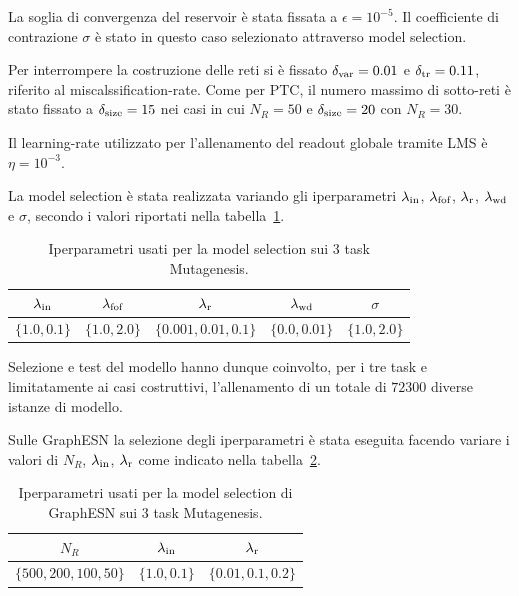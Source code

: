 La soglia di convergenza del reservoir è stata fissata a $\epsilon = 10^{-5}$. Il coefficiente di contrazione $\sigma$ è stato in questo caso selezionato attraverso model selection.

Per interrompere la costruzione delle reti si è fissato $\delta_\textup{var} = 0.01$ e $\delta_\textup{tr} = 0.11$, riferito al miscalssification-rate. Come per PTC, il numero massimo di sotto-reti è stato fissato a $\delta_\textup{size} = 15$ nei casi in cui $N_R = 50$ e $\delta_\textup{size} = 20$ con $N_R = 30$.

Il learning-rate utilizzato per l'allenamento del readout globale tramite LMS è $\eta = 10^{-3}$.

La model selection è stata realizzata variando gli iperparametri $\lambda_\textup{in}$, $\lambda_\textup{fof}$, $\lambda_\textup{r}$,  $\lambda_\textup{wd}$ e $\sigma$, secondo i valori riportati nella tabella~\ref{tab:esperimenti:grigliaMutag}.
\begin{table}[tbp]
\small
\caption[Model selection: iperparametri per Mutagenesis]{Iperparametri usati per la model selection sui 3 task Mutagenesis.}
\label{tab:esperimenti:grigliaMutag}
\centering
\begin{tabular}{*{5}{c}}
\toprule
$\lambda_\textup{in}$ & $\lambda_\textup{fof}$ & $\lambda_\textup{r}$ & $\lambda_\textup{wd}$ & $\sigma$ \\
\midrule
$\lbrace 1.0, 0.1 \rbrace$ & $\lbrace 1.0, 2.0 \rbrace$ & $\lbrace 0.001, 0.01, 0.1 \rbrace$ & $\lbrace 0.0, 0.01 \rbrace$ &  $\lbrace 1.0, 2.0 \rbrace$\\
\bottomrule
\end{tabular}
\end{table}
Selezione e test del modello hanno dunque coinvolto, per i tre task e limitatamente ai casi costruttivi, l'allenamento di un totale di $72300$ diverse istanze di modello.

Sulle GraphESN la selezione degli iperparametri è stata eseguita facendo variare i valori di $N_R$, $\lambda_\textup{in}$, $\lambda_\textup{r}$ come indicato nella tabella~\ref{tab:esperimenti:grigliaMutagStandard}.
\begin{table}[tbp]
\small
\caption[Model selection: iperparametri per GraphESN su Mutag]{Iperparametri usati per la model selection di GraphESN sui 3 task Mutagenesis.}
\label{tab:esperimenti:grigliaMutagStandard}
\centering
\begin{tabular}{*{3}{c}}
\toprule
$N_R$ & $\lambda_\textup{in}$ & $\lambda_\textup{r}$ \\
\midrule
$\lbrace 500, 200, 100, 50 \rbrace$ & $\lbrace 1.0, 0.1 \rbrace$ & $\lbrace 0.01, 0.1, 0.2 \rbrace$ \\
\bottomrule
\end{tabular}
\end{table}

